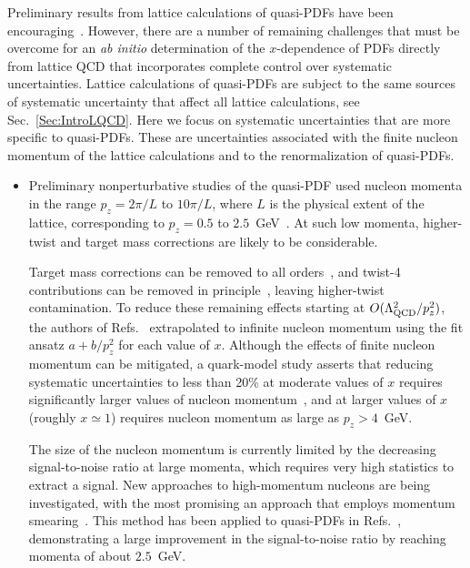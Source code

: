 Preliminary results from lattice calculations of quasi-PDFs have been 
encouraging~\cite{Lin:2014zya,Alexandrou:2015rja,Chen:2016utp,
Alexandrou:2016jqi}. 
%
However, there are a number of remaining challenges that must be overcome for 
an {\it ab initio} determination of the $x$-dependence of PDFs directly from 
lattice QCD that incorporates complete control over systematic uncertainties. 
%
Lattice calculations of quasi-PDFs are subject to the same sources of 
systematic uncertainty that affect all lattice calculations, see 
Sec.~\ref{Sec:IntroLQCD}. 
%
Here we focus on systematic uncertainties that are more specific to quasi-PDFs.
%
These are uncertainties associated with the finite nucleon momentum of the 
lattice calculations and to the renormalization of quasi-PDFs.

\begin{itemize}

\item Preliminary nonperturbative studies of the quasi-PDF used nucleon 
momenta in the range $p_z = 2\pi/L$ to $10\pi/L$, where $L$ is the physical 
extent of the lattice, corresponding to $p_z = 0.5$ to 
$2.5$~GeV~\cite{Lin:2014zya,Alexandrou:2015rja,Chen:2016utp,Alexandrou:2016jqi}.
%
At such low momenta, higher-twist and target mass corrections are likely to be 
considerable.

Target mass corrections can be removed to all orders~\cite{Chen:2016utp}, and 
twist-4 contributions can be removed in 
principle~\cite{Chen:2016utp,Radyushkin:2016hsy}, leaving higher-twist 
contamination. 
%
To reduce these remaining effects starting at $O(\Lambda_{\rm QCD}^2/p_z^2)$, 
the authors of Refs.~\cite{Lin:2014zya,Chen:2016utp} extrapolated to infinite 
nucleon momentum using the fit ansatz $a + b/p_z^2$ for each value of $x$. 
%
Although the effects of finite nucleon momentum can be mitigated, a quark-model 
study asserts that reducing systematic uncertainties to less than 20\% at 
moderate values of $x$ requires significantly larger values of nucleon 
momentum~\cite{Gamberg:2014zwa}, and at larger values of $x$ 
(roughly $x\simeq 1$) requires nucleon momentum as large as $p_z > 4$~GeV.

The size of the nucleon momentum is currently limited by the decreasing 
signal-to-noise ratio at large momenta, which requires very high statistics 
to extract a signal. 
%
New approaches to high-momentum nucleons are being investigated, with the most 
promising an approach that employs momentum smearing~\cite{Bali:2016lva}. 
%
This method has been applied to quasi-PDFs in 
Refs.~\cite{Alexandrou:2016jqi,Green:2017xeu}, demonstrating a large 
improvement in the signal-to-noise ratio by reaching momenta of about $2.5$~GeV.


\end{itemize}
